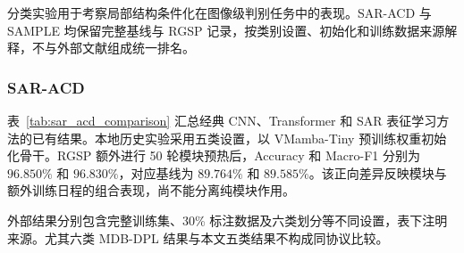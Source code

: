 \documentclass[journal]{IEEEtran}
\begin{document}
分类实验用于考察局部结构条件化在图像级判别任务中的表现。SAR-ACD 与 SAMPLE 均保留完整基线与 RGSP 记录，按类别设置、初始化和训练数据来源解释，不与外部文献组成统一排名。

\subsubsection{SAR-ACD}
\label{sec:sar_acd_results}

表~\ref{tab:sar_acd_comparison} 汇总经典 CNN、Transformer 和 SAR 表征学习方法的已有结果。本地历史实验采用五类设置，以 VMamba-Tiny 预训练权重初始化骨干。RGSP 额外进行 50 轮模块预热后，Accuracy 和 Macro-F1 分别为 $96.850\%$ 和 $96.830\%$，对应基线为 $89.764\%$ 和 $89.585\%$。该正向差异反映模块与额外训练日程的组合表现，尚不能分离纯模块作用。

外部结果分别包含完整训练集、30\% 标注数据及六类划分等不同设置，表下注明来源。尤其六类 MDB-DPL 结果与本文五类结果不构成同协议比较。
\end{document}
